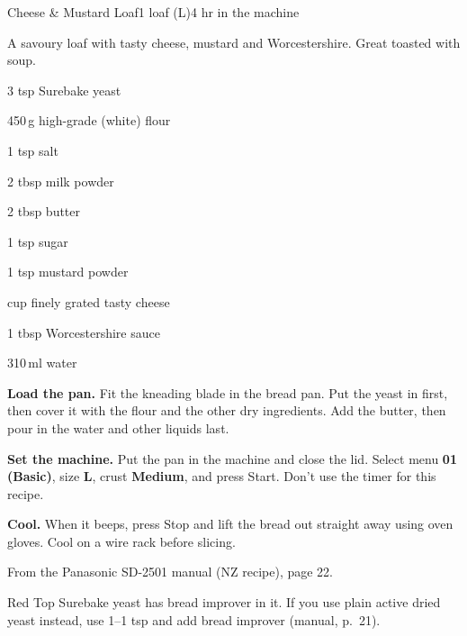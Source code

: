 \begin{recipebox}{Cheese \& Mustard Loaf}{1 loaf (L)}{4 hr in the machine}

A savoury loaf with tasty cheese, mustard and Worcestershire. Great toasted with soup.

\begin{ingredients}
  \item 3 tsp Surebake yeast
  \item 450\,g high-grade (white) flour
  \item 1 tsp salt
  \item 2 tbsp milk powder
  \item 2 tbsp butter
  \item 1 tsp sugar
  \item 1 tsp mustard powder
  \item {} cup finely grated tasty cheese
  \item 1 tbsp Worcestershire sauce
  \item 310\,ml water
\end{ingredients}

\begin{method}
  \item \textbf{Load the pan.} Fit the kneading blade in the bread pan. Put the yeast in first, then cover it with the flour and the other dry ingredients. Add the butter, then pour in the water and other liquids last.
  \item \textbf{Set the machine.} Put the pan in the machine and close the lid. Select menu \textbf{01 (Basic)}, size \textbf{L}, crust \textbf{Medium}, and press Start. Don't use the timer for this recipe.
  \item \textbf{Cool.} When it beeps, press Stop and lift the bread out straight away using oven gloves. Cool on a wire rack before slicing.
\end{method}

\begin{notelist}
  \item From the Panasonic SD-2501 manual (NZ recipe), page 22.
  \item Red Top Surebake yeast has bread improver in it. If you use plain active dried yeast instead, use 1--1 tsp and add bread improver (manual, p.~21).
\end{notelist}

\end{recipebox}
